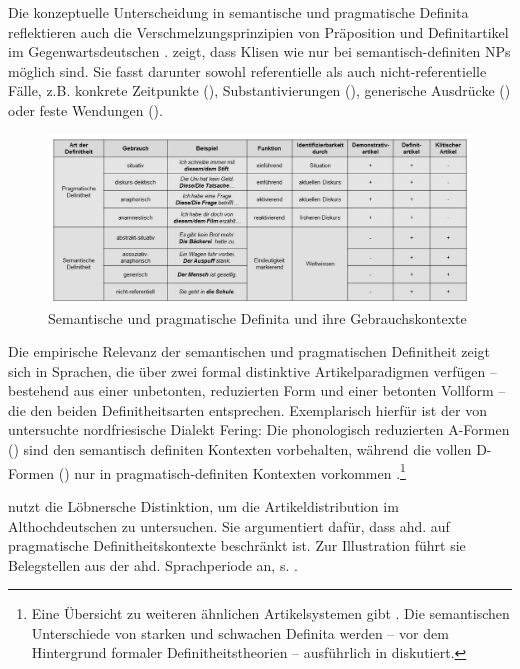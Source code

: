 Die konzeptuelle Unterscheidung in semantische und pragmatische Definita reflektieren auch  die Verschmelzungsprinzipien von Präposition und Definitartikel im Gegenwartsdeutschen \parencite[311f.]{Lobner1985}. \textcite[109f.]{Nubling2005} zeigt, dass Klisen wie  nur bei semantisch-definiten NPs möglich sind. Sie fasst darunter sowohl referentielle als auch nicht-referentielle Fälle, z.B. konkrete Zeitpunkte (),  Substantivierungen (), generische Ausdrücke () oder feste Wendungen (). 

\begin{figure}[h]
\begin{center}
\includegraphics[width=12cm]{images/definit-kontexte-neu-sw.jpg}
\caption {Semantische und pragmatische Definita und ihre Gebrauchskontexte}
\label{abb:definita}
\end{center}
\end{figure}

Die empirische Relevanz der semantischen und pragmatischen Definitheit zeigt sich in Sprachen, die über zwei formal distinktive Artikelparadigmen verfügen -- bestehend aus einer unbetonten, reduzierten Form und einer betonten Vollform -- die den beiden Definitheitsarten entsprechen. Exemplarisch hierfür ist der von \textcite{Ebert1971} untersuchte  nordfriesische Dialekt Fering: Die phonologisch reduzierten A-Formen () sind den semantisch definiten Kontexten vorbehalten, während die vollen D-Formen () nur in pragmatisch-definiten Kontexten vorkommen \parencite[529]{deMulder2011}.\footnote{Eine Übersicht zu weiteren ähnlichen Artikelsystemen gibt \textcite[]{Studler2011}. Die semantischen Unterschiede von starken und schwachen Definita werden -- vor dem Hintergrund formaler Definitheitstheorien -- ausführlich in \textcite{Schwarz2009} diskutiert.}

\textcite[112--117]{Demske2001} nutzt die Löbnersche Distinktion, um die Artikeldistribution im Althochdeutschen zu untersuchen. Sie argumentiert dafür, dass ahd.   auf pragmatische Definitheitskontexte beschränkt ist. Zur Illustration führt sie Belegstellen aus der ahd. Sprachperiode an, s. . 

